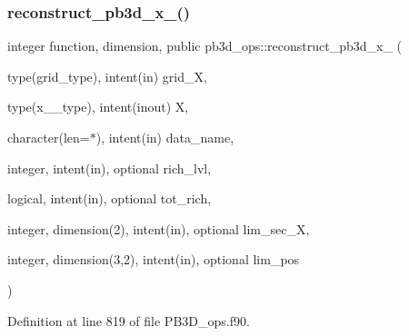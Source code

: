 \subsubsection{\texorpdfstring{reconstruct\+\_\+pb3d\+\_\+x\+\_()}{reconstruct\_pb3d\_x\_1()}}
{\footnotesize\ttfamily integer function, dimension, public pb3d\+\_\+ops\+::reconstruct\+\_\+pb3d\+\_\+x\+\_ (\begin{DoxyParamCaption}\item[{type(grid\+\_\+type), intent(in)}]{grid\+\_\+X,  }\item[{type(x\+\_\+1\+\_\+type), intent(inout)}]{X,  }\item[{character(len=$\ast$), intent(in)}]{data\+\_\+name,  }\item[{integer, intent(in), optional}]{rich\+\_\+lvl,  }\item[{logical, intent(in), optional}]{tot\+\_\+rich,  }\item[{integer, dimension(2), intent(in), optional}]{lim\+\_\+sec\+\_\+X,  }\item[{integer, dimension(3,2), intent(in), optional}]{lim\+\_\+pos }\end{DoxyParamCaption})}



Definition at line 819 of file P\+B3\+D\+\_\+ops.\+f90.

